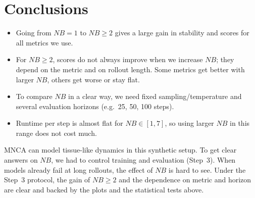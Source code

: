 \documentclass[11pt,a4paper]{article}
\begin{document}
\section{Conclusions}

\begin{itemize}
\item Going from \(NB=1\) to \(NB\ge2\) gives a large gain in stability and scores for all metrics we use.
\item For \(NB\ge2\), scores do not always improve when we increase \(NB\); they depend on the metric and on rollout length. Some metrics get better with larger \(NB\), others get worse or stay flat.
\item To compare \(NB\) in a clear way, we need fixed sampling/temperature and several evaluation horizons (e.g.\ 25, 50, 100 steps).
\item Runtime per step is almost flat for \(NB\in[1,7]\), so using larger \(NB\) in this range does not cost much.
\end{itemize}

MNCA can model tissue-like dynamics in this synthetic setup. To get clear answers on \(NB\), we had to control training and evaluation (Step~3). When models already fail at long rollouts, the effect of \(NB\) is hard to see. Under the Step~3 protocol, the gain of \(NB\ge2\) and the dependence on metric and horizon are clear and backed by the plots and the statistical tests above.
\end{document}
